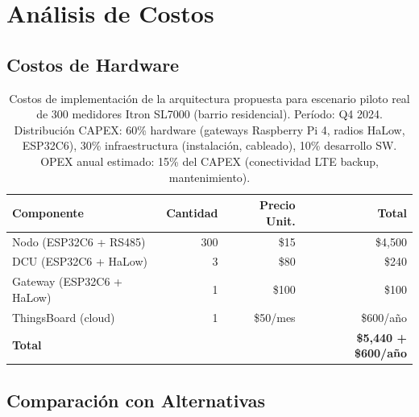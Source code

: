 ﻿\section{Análisis de Costos}

\subsection{Costos de Hardware}

\begin{table}[h]
\centering
\begin{tabular}{|l|r|r|r|}
\hline
\textbf{Componente} & \textbf{Cantidad} & \textbf{Precio Unit.} & \textbf{Total} \\
\hline
Nodo (ESP32C6 + RS485) & 300 & \$15 & \$4,500 \\
DCU (ESP32C6 + HaLow) & 3 & \$80 & \$240 \\
Gateway (ESP32C6 + HaLow) & 1 & \$100 & \$100 \\
ThingsBoard (cloud) & 1 & \$50/mes & \$600/año \\
\hline
\textbf{Total} & & & \textbf{\$5,440 + \$600/año} \\
\hline
\end{tabular}
\caption{Costos de implementación de la arquitectura propuesta para escenario piloto real de 300 medidores Itron SL7000 (barrio residencial). Período: Q4 2024. Distribución CAPEX: 60\% hardware (gateways Raspberry Pi 4, radios HaLow, ESP32C6), 30\% infraestructura (instalación, cableado), 10\% desarrollo SW. OPEX anual estimado: 15\% del CAPEX (conectividad LTE backup, mantenimiento).}
\label{tab:implementation-costs}
\end{table}

\subsection{Comparación con Alternativas}

